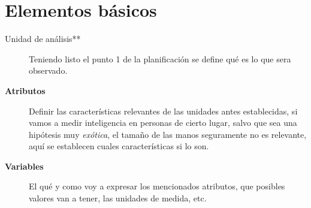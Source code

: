 \documentclass[letterpaper,10pt,openany,oneside]{sphinxmanual}
\begin{document}
\section{Elementos básicos}
\label{Estadistica:elementos-basicos}\begin{description}
\item[{Unidad de análisis**}] \leavevmode
Teniendo listo el punto 1 de la planificación se define qué es lo que sera observado.

\item[{\textbf{Atributos}}] \leavevmode
Definir las características relevantes de las unidades antes establecidas, si vamos a
medir inteligencia en personas de cierto lugar, salvo que sea una hipótesis muy \emph{exótica},
el tamaño de las manos seguramente no es relevante, aquí se establecen cuales
características si lo son.

\item[{\textbf{Variables}}] \leavevmode
El qué y como voy a expresar los mencionados atributos, que posibles valores van a
tener, las unidades de medida, etc.

\end{description}
\end{document}
